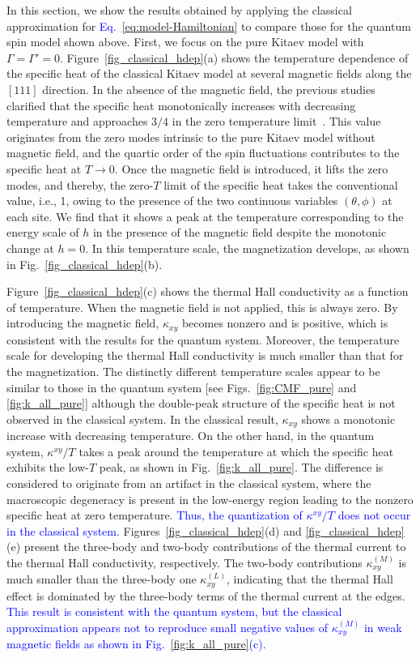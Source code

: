 \documentclass[reprint,amsmath,amssymb,aps,prx]{revtex4-2}
\newcommand{\blue}[1]{\textcolor{blue}{#1}}
\begin{document}
In this section, we show the results obtained by applying the classical approximation for \blue{Eq.~\eqref{eq:model-Hamiltonian}} to compare those for the quantum spin model shown above.
First, we focus on the pure Kitaev model with $\Gamma=\Gamma'=0$.
Figure~\ref{fig_classical_hdep}(a) shows the temperature dependence of the specific heat of the classical Kitaev model at several magnetic fields along the $[111]$ direction.
In the absence of the magnetic field, the previous studies clarified that the specific heat monotonically increases with decreasing temperature and approaches $3/4$ in the zero temperature limit\blue{~\cite{Sela2014,suzuki2018}}.
This value originates from the zero modes intrinsic to the pure Kitaev model without magnetic field, and the quartic order of the spin fluctuations contributes to the specific heat at $T\to 0$.
Once the magnetic field is introduced, it lifts the zero modes, and thereby, the zero-$T$ limit of the specific heat takes the conventional value, i.e., 1, owing to the presence of the two continuous variables $(\theta,\phi)$ at each site.
We find that it shows a peak at the temperature corresponding to the energy scale of $h$ in the presence of the magnetic field despite the monotonic change at $h=0$.
In this temperature scale, the magnetization develops, as shown in Fig.~\ref{fig_classical_hdep}(b).

Figure~\ref{fig_classical_hdep}(c) shows the thermal Hall conductivity as a function of temperature.
When the magnetic field is not applied, this is always zero.
By introducing the magnetic field, $\kappa_{xy}$ becomes nonzero and is positive, which is consistent with the results for the quantum system.
Moreover, the temperature scale for developing the thermal Hall conductivity is much smaller than that for the magnetization.
The distinctly different temperature scales appear to be similar to those in the quantum system [see Figs.~\ref{fig:CMF_pure} and \ref{fig:k_all_pure}] although the double-peak structure of the specific heat is not observed in the classical system.
In the classical result, $\kappa_{xy}$ shows a monotonic increase with decreasing temperature.
On the other hand, in the quantum system, $\kappa^{xy}/T$ takes a peak around the temperature at which the specific heat exhibits the low-$T$ peak, as shown in Fig.~\ref{fig:k_all_pure}.
The difference is considered to originate from an artifact in the classical system, where the macroscopic degeneracy is present in the low-energy region leading to the nonzero specific heat at zero temperature.
\blue{Thus, the quantization of $\kappa^{xy}/T$ does not occur in the classical system.}
Figures~\ref{fig_classical_hdep}(d) and \ref{fig_classical_hdep}(e) present the three-body and two-body contributions of the thermal current to the thermal Hall conductivity, respectively.
The two-body contributions $\kappa_{xy}^{(M)}$ is much smaller than the three-body one $\kappa_{xy}^{(L)}$, indicating that the thermal Hall effect is dominated by the three-body terms of the thermal current at the edges.
\blue{This result is consistent with the quantum system, but the classical approximation appears not to reproduce small negative values of $\kappa_{xy}^{(M)}$ in weak magnetic fields as shown in Fig.~\ref{fig:k_all_pure}(c).}
\end{document}

